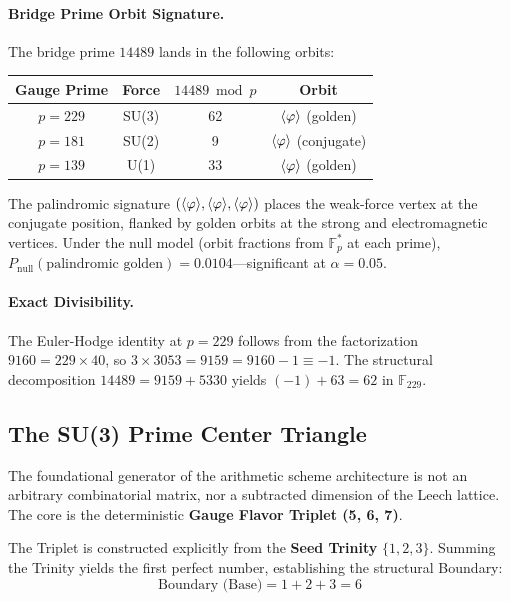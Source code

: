 \paragraph{Bridge Prime Orbit Signature.}
The bridge prime $14489$ lands in the following orbits:
\begin{center}
\begin{tabular}{@{}cccc@{}}
\toprule
\textbf{Gauge Prime} & \textbf{Force} & $14489 \bmod p$ & \textbf{Orbit} \\
\midrule
$p = 229$ & SU(3) & 62 & $\langle\varphi\rangle$ (golden) \\
$p = 181$ & SU(2) & 9 & $\langle\varphi\rangle$ (conjugate) \\
$p = 139$ & U(1) & 33 & $\langle\varphi\rangle$ (golden) \\
\bottomrule
\end{tabular}
\end{center}
The palindromic signature $(\langle\varphi\rangle, \langle\varphi\rangle, \langle\varphi\rangle)$ places the weak-force vertex at the conjugate position, flanked by golden orbits at the strong and electromagnetic vertices. Under the null model (orbit fractions from $\mathbb{F}_p^*$ at each prime), $P_{\text{null}}(\text{palindromic golden}) = 0.0104$---significant at $\alpha = 0.05$.

\paragraph{Exact Divisibility.}
The Euler-Hodge identity at $p = 229$ follows from the factorization $9160 = 229 \times 40$, so $3 \times 3053 = 9159 = 9160 - 1 \equiv -1$. The structural decomposition $14489 = 9159 + 5330$ yields $(-1) + 63 = 62$ in $\mathbb{F}_{229}$.


\subsection{The SU(3) Prime Center Triangle}

The foundational generator of the arithmetic scheme architecture is not an arbitrary combinatorial matrix, nor a subtracted dimension of the Leech lattice. The core is the deterministic \textbf{Gauge Flavor Triplet (5, 6, 7)}. 

The Triplet is constructed explicitly from the \textbf{Seed Trinity} $\{1, 2, 3\}$. Summing the Trinity yields the first perfect number, establishing the structural Boundary:
\begin{equation}
    \text{Boundary (Base)} = 1 + 2 + 3 = 6
\end{equation}

